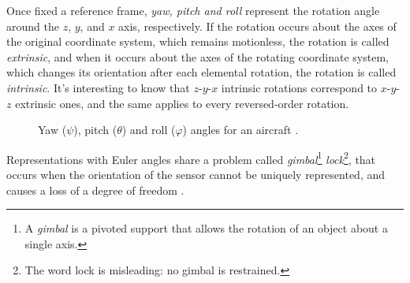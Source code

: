 Once fixed a reference frame, \textit{yaw, pitch and roll} represent the rotation angle around the $z$, $y$, and $x$ axis, respectively.
If the rotation occurs about the axes of the original coordinate system, which remains motionless, the rotation is called \textit{extrinsic}, and when it occurs about the axes of the rotating coordinate system, which changes its orientation after each elemental rotation, the rotation is called \textit{intrinsic}. It's interesting to know that $z$-$y$-$x$ intrinsic rotations correspond to $x$-$y$-$z$ extrinsic ones, and the same applies to every reversed-order rotation.

\begin{center}
	\begin{figure}[ht!]
		\caption{Yaw ($\psi$), pitch ($\theta$) and roll ($\varphi$) angles for an aircraft \cite{WikimediaPlane}.}
	\end{figure}
\end{center}
Representations with Euler angles share a problem called \textit{gimbal}\footnote{A \textit{gimbal} is a pivoted support that allows the rotation of an object about a single axis.} \textit{lock}\footnote{The word lock is misleading: no gimbal is restrained.}, that occurs when the orientation of the sensor cannot be uniquely represented, and causes a loss of a degree of freedom \cite{Dil18}.

